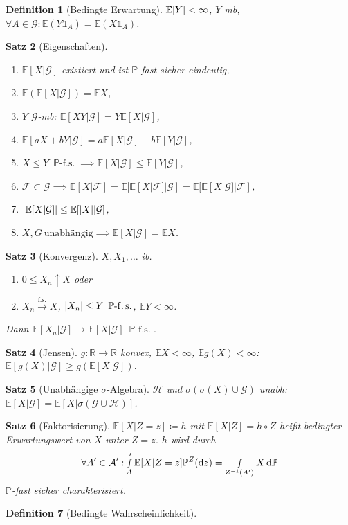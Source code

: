 \documentclass[a4paper,8pt]{article}
\newcounter{Sec}
\theoremstyle{nonumberbreak}
\newtheorem{definition}{Definition}[Sec]
\newtheorem{satz}[definition]{Satz}
\newcommand{\defas}{\coloneqq}
\newcommand{\ind}{\mathds{1}}
\renewcommand{\P}{\mathbb{P}}
\newcommand{\R}{\mathbb{R}}
\newcommand{\E}{\mathbb{E}}
\newcommand{\EV}[2]{\E[#1|#2]}
\newcommand{\BE}[2]{\EV{#1}{\mathcal{#2}}}
\newcommand{\fsk}{\mathrel{\stackrel{\operatorname{f.s.}}{\longrightarrow}}}
\newcommand{\fs}[1]{~\operatorname{#1-f.s.}}
\begin{document}
\begin{multicols}{3}
\begin{definition}[Bedingte Erwartung]
		$\E\abs{Y}<\infty$, $Y$ mb, $\forall A\in\mathcal{G}:\E(Y\ind_A)=\E(X\ind_A)$.
	\end{definition}
	\begin{satz}[Eigenschaften]
		\begin{enumerate}[label=(\alph*)]
			\item $\BE{X}{G}$ existiert und ist $\P$-fast sicher eindeutig,
			\item $\E(\BE{X}{G})=\E X$,
			\item $Y$ $\mathcal{G}$-mb: $\BE{XY}{G}=Y\BE{X}{G}$,
			\item $\BE{aX+bY}{G}=a\BE{X}{G}+b\BE{Y}{G}$,
			\item $X\leq Y\fs{\P}\implies\BE{X}{G}\leq\BE{Y}{G}$,
			\item $\mathcal{F}\subset\mathcal{G}\implies \BE{X}{F}=\BE{\BE{X}{F}}{G}=\BE{\BE{X}{G}}{F}$,
			\item $\abs{\BE{X}{G}}\leq\BE{\abs{X}}{G}$,
			\item $X, G~\text{unabhängig}\implies\BE{X}{G}=\E X$.
		\end{enumerate}
	\end{satz}
	\begin{satz}[Konvergenz]
		$X, X_1,\ldots$ ib.
		\begin{enumerate}[label=(\alph*)]
			\item $0\leq X_n\uparrow X$ oder
			\item $X_n\fsk X$, $\abs{X_n}\leq Y\fs{\P}$, $\E Y<\infty$.
		\end{enumerate}
		Dann $\BE{X_n}{G}\to\BE{X}{G}\fs{\P}$.
	\end{satz}
	\begin{satz}[Jensen]
		$g\colon\R\to\R$ konvex, $\E X<\infty$, $\E g(X)<\infty$: $\BE{g(X)}{G}\geq g(\BE{X}{G})$.
	\end{satz}
	\begin{satz}[Unabhängige $\sigma$-Algebra]
		$\mathcal{H}$ und $\sigma(\sigma(X)\cup\mathcal{G})$ unabh: $\BE{X}{G}=\EV{X}{\sigma(\mathcal{G}\cup\mathcal{H})}$.
	\end{satz}
	\begin{satz}[Faktorisierung]
		$\EV{X}{Z=z}\defas h$ mit $\EV{X}{Z}=h\circ Z$ heißt bedingter Erwartungswert von
		$X$ unter $Z=z$. $h$ wird durch
		\[
			\forall A'\in\mathcal{A}': \smallint_A'\EV{X}{Z=z}\P^Z(\dd{z})=\smallint_{Z^{-1}(A')}X\dd{\P}
		\]
		$\P$-fast sicher charakterisiert.
	\end{satz}
	\begin{definition}[Bedingte Wahrscheinlichkeit]

\end{definition}
\end{multicols}
\end{document}

